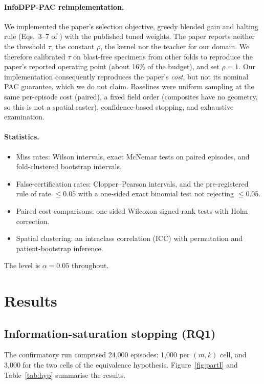 \documentclass[11pt]{article}
\theoremstyle{remark}
\theoremstyle{definition}
\begin{document}
\paragraph{InfoDPP-PAC reimplementation.} We implemented the paper's selection objective, greedy blended gain and halting rule (Eqs.~3--7 of \cite{mittal2026infodpp}) with the published tuned weights. The paper reports neither the threshold $\tau$, the constant $\rho$, the kernel nor the teacher for our domain. We therefore calibrated $\tau$ on blast-free specimens from other folds to reproduce the paper's reported operating point (about 16\% of the budget), and set $\rho=1$. Our implementation consequently reproduces the paper's \emph{cost}, but not its nominal PAC guarantee, which we do not claim. Baselines were uniform sampling at the same per-episode cost (paired), a fixed field order (composites have no geometry, so this is not a spatial raster), confidence-based stopping, and exhaustive examination.

\paragraph{Statistics.}
\begin{itemize}
\item Miss rates: Wilson intervals, exact McNemar tests on paired episodes, and fold-clustered bootstrap intervals.
\item False-certification rates: Clopper--Pearson intervals, and the pre-registered rule of rate $\le 0.05$ with a one-sided exact binomial test not rejecting $\le0.05$.
\item Paired cost comparisons: one-sided Wilcoxon signed-rank tests with Holm correction.
\item Spatial clustering: an intraclass correlation (ICC) with permutation and patient-bootstrap inference.
\end{itemize}
The level is $\alpha=0.05$ throughout.

\section{Results}
\subsection{Information-saturation stopping (RQ1)}\label{sec:partI}
The confirmatory run comprised 24,000 episodes: 1,000 per $(m,k)$ cell, and 3,000 for the two cells of the equivalence hypothesis. Figure~\ref{fig:partI} and Table~\ref{tab:hyp} summarise the results.
\end{document}
